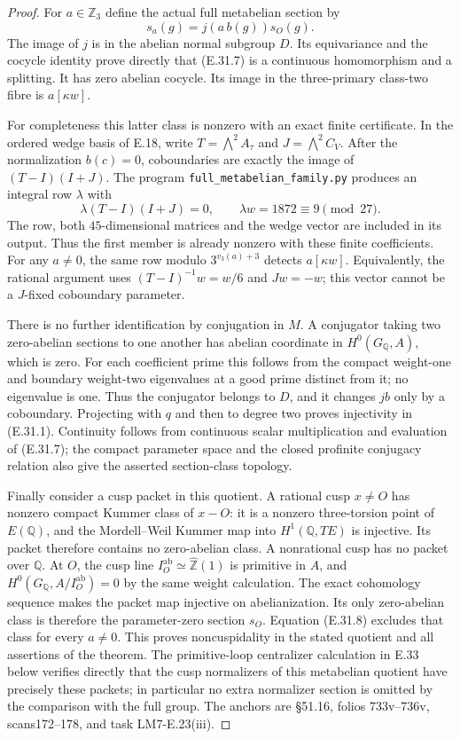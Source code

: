 \documentclass[11pt,oneside]{article}
\begin{document}
\begin{proof}
For $a\in\mathbb Z_3$ define the actual full metabelian
section by
\[
                     s_a(g)=j(a\,b(g))s_O(g).
 \tag{E.31.7}
\]
The image of $j$ is in the abelian normal subgroup $D$.
Its equivariance and the cocycle identity prove directly
that (E.31.7) is a continuous homomorphism and a splitting.
It has zero abelian cocycle. Its image in the three-primary
class-two fibre is $a[\kappa w]$.

For completeness this latter class is nonzero with an exact
finite certificate. In the ordered wedge basis of E.18,
write $T=\bigwedge^2 A_\tau$ and $J=\bigwedge^2 C_V$.
After the normalization $b(c)=0$, coboundaries are exactly
the image of $(T-I)(I+J)$. The program
\texttt{full\_metabelian\_family.py} produces an integral
row $\lambda$ with
\[
 \lambda(T-I)(I+J)=0,
                   \qquad \lambda w=1872\equiv9\pmod{27}.
 \tag{E.31.8}
\]
The row, both $45$-dimensional matrices and the wedge
vector are included in its output. Thus the first member
is already nonzero with these finite coefficients.
For any $a\ne0$, the same row modulo
$3^{v_3(a)+3}$ detects $a[\kappa w]$.
Equivalently, the rational argument uses
$(T-I)^{-1}w=w/6$ and $Jw=-w$; this vector cannot be
a $J$-fixed coboundary parameter.

There is no further identification by conjugation in $M$.
A conjugator taking two zero-abelian sections to one another
has abelian coordinate in $H^0(G_{\mathbb Q},A)$, which is zero.
For each coefficient prime this follows from the compact
weight-one and boundary weight-two eigenvalues at a good
prime distinct from it; no eigenvalue is one. Thus the
conjugator belongs to $D$, and it changes $jb$ only by a
coboundary. Projecting with $q$ and then to degree two
proves injectivity in (E.31.1). Continuity follows from
continuous scalar multiplication and evaluation of (E.31.7);
the compact parameter space and the closed profinite
conjugacy relation also give the asserted section-class topology.

Finally consider a cusp packet in this quotient. A rational
cusp $x\ne O$ has nonzero compact Kummer class of $x-O$:
it is a nonzero three-torsion point of $E(\mathbb Q)$,
and the Mordell--Weil Kummer map into $H^1(\mathbb Q,TE)$
is injective. Its packet therefore contains no zero-abelian
class. A nonrational cusp has no packet over $\mathbb Q$.
At $O$, the cusp line $I_O^{\mathrm{ab}}\simeq
\widehat{\mathbb Z}(1)$ is primitive in $A$, and
$H^0(G_{\mathbb Q},A/I_O^{\mathrm{ab}})=0$ by the same
weight calculation. The exact cohomology sequence makes
the packet map injective on abelianization. Its only
zero-abelian class is therefore the parameter-zero
section $s_O$. Equation (E.31.8) excludes that class
for every $a\ne0$. This proves noncuspidality in the
stated quotient and all assertions of the theorem.
The primitive-loop centralizer calculation in E.33
below verifies directly that the cusp normalizers
of this metabelian quotient have precisely these
packets; in particular no extra normalizer section
is omitted by the comparison with the full group.
The anchors are \S51.16, folios 733v--736v, scans172--178,
and task LM7-E.23(iii).
\end{proof}
\end{document}
